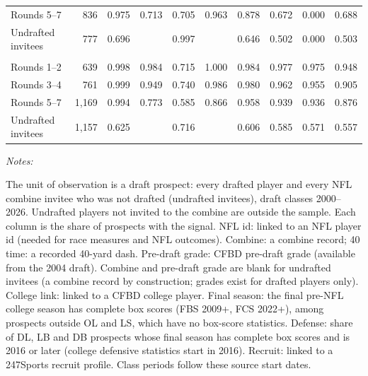 \begin{table}[!h]
{\begin{threeparttable}
\begin{tabular}[t]{lrrrrrrrrr}
\hspace{1em}Rounds 5--7 & 836 & 0.975 & 0.713 & 0.705 & 0.963 & 0.878 & 0.672 & 0.000 & 0.688\\
\hspace{1em}Undrafted invitees & 777 & 0.696 &  & 0.997 &  & 0.646 & 0.502 & 0.000 & 0.503\\
\addlinespace[0.3em]
\multicolumn{10}{l}{\textbf{Draft classes 2017--2026}}\\
\hspace{1em}Rounds 1--2 & 639 & 0.998 & 0.984 & 0.715 & 1.000 & 0.984 & 0.977 & 0.975 & 0.948\\
\hspace{1em}Rounds 3--4 & 761 & 0.999 & 0.949 & 0.740 & 0.986 & 0.980 & 0.962 & 0.955 & 0.905\\
\hspace{1em}Rounds 5--7 & 1,169 & 0.994 & 0.773 & 0.585 & 0.866 & 0.958 & 0.939 & 0.936 & 0.876\\
\hspace{1em}Undrafted invitees & 1,157 & 0.625 &  & 0.716 &  & 0.606 & 0.585 & 0.571 & 0.557\\
\bottomrule
\end{tabular}
\begin{tablenotes}[para]
\item \textit{Notes:} 
\item The unit of observation is a draft prospect: every drafted player and every NFL combine invitee who was not drafted (undrafted invitees), draft classes 2000--2026. Undrafted players not invited to the combine are outside the sample. Each column is the share of prospects with the signal. NFL id: linked to an NFL player id (needed for race measures and NFL outcomes). Combine: a combine record; 40 time: a recorded 40-yard dash. Pre-draft grade: CFBD pre-draft grade (available from the 2004 draft). Combine and pre-draft grade are blank for undrafted invitees (a combine record by construction; grades exist for drafted players only). College link: linked to a CFBD college player. Final season: the final pre-NFL college season has complete box scores (FBS 2009+, FCS 2022+), among prospects outside OL and LS, which have no box-score statistics. Defense: share of DL, LB and DB prospects whose final season has complete box scores and is 2016 or later (college defensive statistics start in 2016). Recruit: linked to a 247Sports recruit profile. Class periods follow these source start dates.
\end{tablenotes}
\end{threeparttable}}
\end{table}
